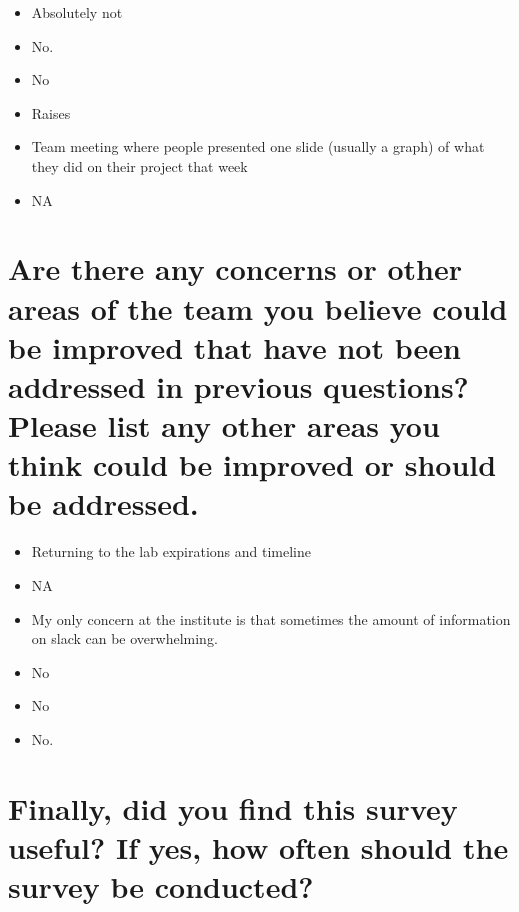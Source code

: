 \documentclass[
]{book}
\providecommand{\tightlist}{%
  \setlength{\itemsep}{0pt}\setlength{\parskip}{0pt}}
\begin{document}
\begin{itemize}
\tightlist
\item
  Absolutely not
\item
  No.
\item
  No
\item
  Raises
\item
  Team meeting where people presented one slide (usually a graph) of what they did on their project that week
\item
  NA
\end{itemize}

\hypertarget{are-there-any-concerns-or-other-areas-of-the-team-you-believe-could-be-improved-that-have-not-been-addressed-in-previous-questions-please-list-any-other-areas-you-think-could-be-improved-or-should-be-addressed.-1}{%
\section{Are there any concerns or other areas of the team you believe could be improved that have not been addressed in previous questions? Please list any other areas you think could be improved or should be addressed.}\label{are-there-any-concerns-or-other-areas-of-the-team-you-believe-could-be-improved-that-have-not-been-addressed-in-previous-questions-please-list-any-other-areas-you-think-could-be-improved-or-should-be-addressed.-1}}

\begin{itemize}
\tightlist
\item
  Returning to the lab expirations and timeline
\item
  NA
\item
  My only concern at the institute is that sometimes the amount of information on slack can be overwhelming.
\item
  No
\item
  No
\item
  No.
\end{itemize}

\hypertarget{finally-did-you-find-this-survey-useful-if-yes-how-often-should-the-survey-be-conducted-1}{%
\section{Finally, did you find this survey useful? If yes, how often should the survey be conducted?}\label{finally-did-you-find-this-survey-useful-if-yes-how-often-should-the-survey-be-conducted-1}}
\end{document}
